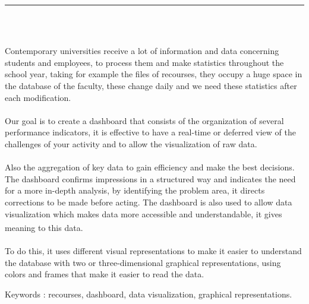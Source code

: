 \documentclass[12pt]{report}
\newenvironment{changemargin}[2]{%
\begin{list}{}{%
\setlength{\topsep}{0pt}%
\setlength{\leftmargin}{#1}%
\setlength{\rightmargin}{#2}%
\setlength{\listparindent}{\parindent}%
\setlength{\itemindent}{\parindent}%
\setlength{\parsep}{\parskip}%
}%
\item[]}{\end{list}}
\begin{document}
\newpage

\vspace*{0.2in}

\thispagestyle{empty}

\begin{center}
    {\color{Blue} \rule{3in}{1.4mm} }\\
    \vspace{0.1in}
    \scshape{\fontsize{34}{46}{\bfseries{\color{Blue}{Abstract}}}}
    \\
    \vspace{0.6in}
\end{center}
\begin{changemargin}{0.9cm}{0.9cm}
Contemporary universities receive a lot of information and data concerning students and employees, to process them and make statistics throughout the school year, taking for example the files of recourses, they occupy a huge space in the database of the faculty, these change daily and we need these statistics after each modification.
\\\\
Our goal is to create a dashboard that consists of the organization of several performance indicators, it is effective to have a real-time or deferred view of the challenges of your activity and to allow the visualization of raw data.
\\\\
  Also the aggregation of key data to gain efficiency and make the best decisions. The dashboard confirms impressions in a structured way and indicates the need for a more in-depth analysis, by identifying the problem area, it directs corrections to be made before acting. The dashboard is also used to allow data visualization which makes data more accessible and understandable, it gives meaning to this data.\textsuperscript{\cite{few2006information}}
\\\\
To do this, it uses different visual representations to make it easier to understand the database with two or three-dimensional graphical representations, using colors and frames that make it easier to read the data.
\end{changemargin}

\vspace{1in}

\begin{changemargin}{0.9cm}{0.9cm}
Keywords : recourses, dashboard, data visualization, graphical representations.
\end{changemargin}
\end{document}
